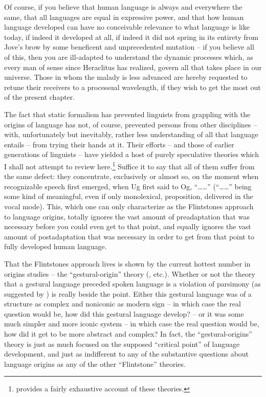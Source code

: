 Of course, if you believe that human language is always and everywhere the same, that all languages are equal in expressive power, and that how human language developed can have no conceivable relevance to what language is like today, if indeed it developed at all, if indeed it did not spring in its entirety from Jove's brow by some beneficent and unprecedented mutation -- if you believe all of this, then you are ill-adapted to understand the dynamic processes which, as every man of sense since Heraclitus has realized, govern all that takes place in our universe. Those in whom the malady is less advanced are hereby requested to retune their receivers to a processual wavelength, if they wish to get the most out of the present chapter.

The fact that static formalism has prevented linguists from grappling with the origins of language has not, of course, prevented persons from other disciplines -- with, unfortunately but inevitably, rather less understanding of all that language entails -- from trying their hands at it. Their efforts -- and those of earlier generations of linguists -- have yielded a host of purely speculative theories which I shall not attempt to review here.\footnote{\citet{Hewes1975} provides a fairly exhaustive account of these theories.} Suffice it to say that all of them suffer from the same defect: they concentrate, exclusively or almost so, on the moment when recognizable speech first emerged, when Ug first said to Og, ``\ldots\ldots'' (``\ldots\ldots'' being some kind of meaningful, even if only monolexical, proposition, delivered in the vocal mode). This, which one can only characterize as the Flintstones approach to lan\-guage origins, totally ignores the vast amount of preadaptation that was necessary before you could even get to that point, and equally ignores the vast amount of postadaptation that was necessary in order to get from that point to fully developed human language.

That the Flintstones approach lives is shown by the current hottest number in origins studies -- the ``gestural-origin'' theory (\citealt{Hewes1973,Hewes1976}, etc.). Whether or not the theory that a gestural language preceded spoken language is a violation of parsimony (as suggested by
\citet{Hill1978}) is really beside the point. Either this gestural language was of a structure as complex and noniconic as modern sign -- in which case the real question would be, how did this gestural language develop? -- or it was some much simpler and more iconic system -- in which case the real question would be, how did it get to be more abstract and complex? In fact, the ``gestural-origins'' theory is just as much focused on the supposed ``critical point'' of language development, and just as indifferent to any of the substantive questions about language origins as any of the other ``Flintstone'' theories.

